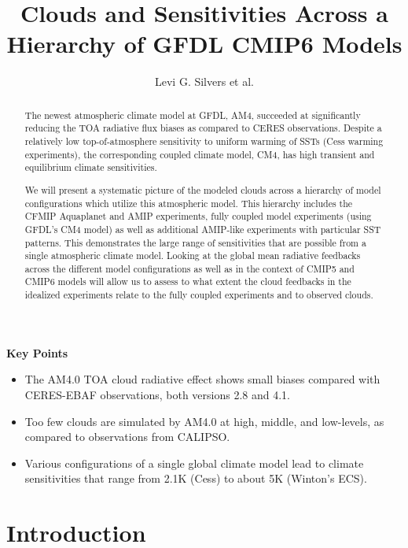 \documentclass[11pt]{article}   	%
\title{Clouds and Sensitivities Across a Hierarchy of GFDL CMIP6 Models}
\author{Levi G. Silvers et al.}
\begin{document}
\maketitle

\begin{abstract}
The newest atmospheric climate model at GFDL, AM4, succeeded at significantly reducing the TOA radiative flux biases as compared to CERES observations.  Despite a relatively low top-of-atmosphere sensitivity to uniform warming of SSTs (Cess warming experiments), the corresponding coupled climate model, CM4, has high transient and equilibrium climate sensitivities.  

We will present a systematic picture of the modeled clouds across a hierarchy of model configurations which utilize this atmospheric model.  This hierarchy includes the CFMIP Aquaplanet and AMIP experiments, fully coupled model experiments (using GFDL's CM4 model) as well as additional AMIP-like experiments with particular SST patterns.  This demonstrates the large range of sensitivities that are possible from a single atmospheric climate model.   Looking at the global mean radiative feedbacks across the different model configurations as well as in the context of CMIP5 and CMIP6 models will allow us to assess to what extent the cloud feedbacks in the idealized experiments relate to the fully coupled experiments and to observed clouds.  
\end{abstract}


\textbf{Key Points}
\begin{itemize}
  \item{The AM4.0 TOA cloud radiative effect shows small biases compared with CERES-EBAF observations, both versions 
  2.8 and 4.1.}
  \item{Too few clouds are simulated by AM4.0 at high, middle, and low-levels, as compared to observations from CALIPSO.}
  \item{Various configurations of a single global climate model lead to climate sensitivities that range from 2.1K (Cess) to 
  about 5K (Winton's ECS).}
\end{itemize}

\section{Introduction}
\end{document}
